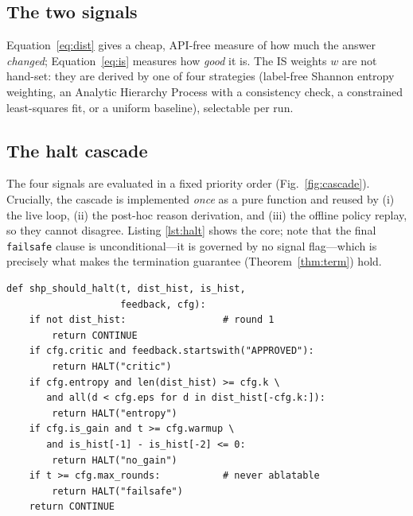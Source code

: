 \documentclass[conference]{IEEEtran}
\begin{document}
\subsection{The two signals}
Equation~\eqref{eq:dist} gives a cheap, API-free measure of how much the answer
\emph{changed}; Equation~\eqref{eq:is} measures how \emph{good} it is. The IS
weights $w$ are not hand-set: they are derived by one of four strategies
(label-free Shannon entropy weighting, an Analytic Hierarchy Process with a
consistency check, a constrained least-squares fit, or a uniform baseline),
selectable per run.

\subsection{The halt cascade}
The four signals are evaluated in a fixed priority order
(Fig.~\ref{fig:cascade}). Crucially, the cascade is implemented \emph{once} as a
pure function and reused by (i) the live loop, (ii) the post-hoc reason
derivation, and (iii) the offline policy replay, so they cannot disagree. Listing
\ref{lst:halt} shows the core; note that the final \texttt{failsafe} clause is
unconditional---it is governed by no signal flag---which is precisely what makes
the termination guarantee (Theorem~\ref{thm:term}) hold.

\medskip
\begin{lstlisting}[style=py,aboveskip=10pt,belowskip=4pt,caption={The single shared halt decision (simplified).},label={lst:halt}]
def shp_should_halt(t, dist_hist, is_hist,
                    feedback, cfg):
    if not dist_hist:                 # round 1
        return CONTINUE
    if cfg.critic and feedback.startswith("APPROVED"):
        return HALT("critic")
    if cfg.entropy and len(dist_hist) >= cfg.k \
       and all(d < cfg.eps for d in dist_hist[-cfg.k:]):
        return HALT("entropy")
    if cfg.is_gain and t >= cfg.warmup \
       and is_hist[-1] - is_hist[-2] <= 0:
        return HALT("no_gain")
    if t >= cfg.max_rounds:           # never ablatable
        return HALT("failsafe")
    return CONTINUE
\end{lstlisting}
\end{document}

